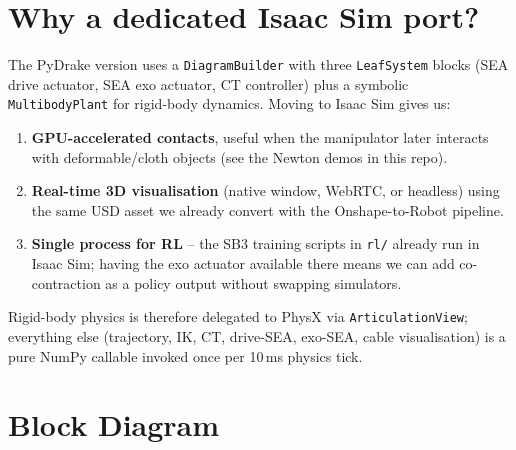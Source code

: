 \documentclass[11pt,a4paper]{article}
\begin{document}
\tableofcontents
\newpage

\section{Why a dedicated Isaac Sim port?}

The PyDrake version uses a \texttt{DiagramBuilder} with three
\texttt{LeafSystem} blocks (SEA drive actuator, SEA exo actuator, CT
controller) plus a symbolic \texttt{MultibodyPlant} for rigid-body
dynamics.  Moving to Isaac Sim gives us:

\begin{enumerate}[leftmargin=2em]
    \item \textbf{GPU-accelerated contacts}, useful when the manipulator
          later interacts with deformable/cloth objects (see the Newton
          demos in this repo).
    \item \textbf{Real-time 3D visualisation} (native window, WebRTC, or
          headless) using the same USD asset we already convert with the
          Onshape-to-Robot pipeline.
    \item \textbf{Single process for RL} -- the SB3 training scripts in
          \texttt{rl/} already run in Isaac Sim; having the exo actuator
          available there means we can add co-contraction as a policy
          output without swapping simulators.
\end{enumerate}

Rigid-body physics is therefore delegated to PhysX via
\texttt{ArticulationView}; everything else (trajectory, IK, CT,
drive-SEA, exo-SEA, cable visualisation) is a pure NumPy callable
invoked once per 10\,ms physics tick.

\section{Block Diagram}
\end{document}
